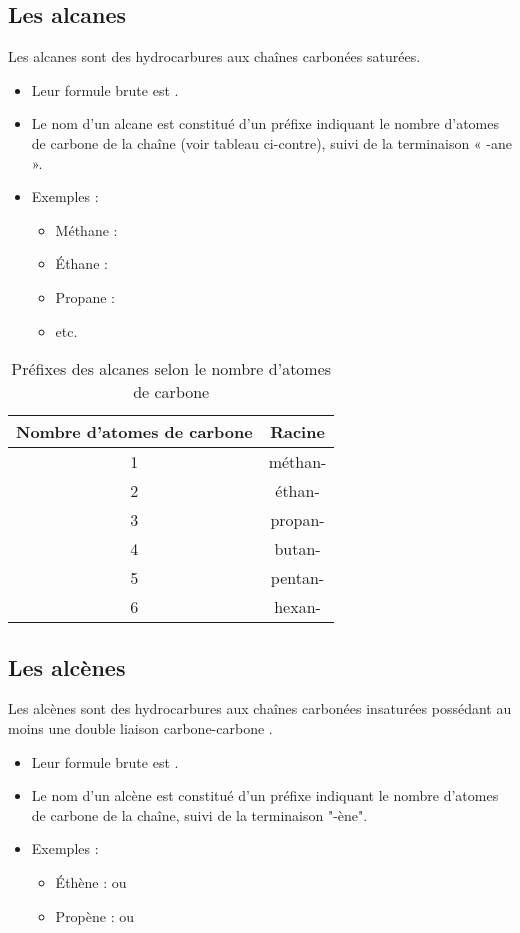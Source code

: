 \documentclass{article}
\begin{document}
\subsection{Les alcanes}

Les alcanes sont des hydrocarbures aux chaînes carbonées saturées.
\begin{itemize}[noitemsep]
    \item Leur formule brute est .
    \item Le nom d’un alcane est constitué d’un préfixe indiquant le nombre d'atomes de carbone de la chaîne (voir tableau ci-contre), suivi de la terminaison « -ane ».
    \item Exemples :
    \begin{itemize}
        \item Méthane : 
        \item Éthane : 
        \item Propane : 
        \item etc.
    \end{itemize}
\end{itemize}

\begin{table}[h]
    \centering
    \begin{tabular}{|c|c|}
    \hline
    Nombre d’atomes de carbone & Racine \\
    \hline
    1 & méthan- \\
    2 & éthan- \\
    3 & propan- \\
    4 & butan- \\
    5 & pentan- \\
    6 & hexan- \\
    \hline
    \end{tabular}
    \caption{Préfixes des alcanes selon le nombre d'atomes de carbone}
\end{table}

\subsection{Les alcènes}

Les alcènes sont des hydrocarbures aux chaînes carbonées insaturées possédant au moins une double liaison carbone-carbone .
\begin{itemize}[noitemsep]
    \item Leur formule brute est .
    \item Le nom d’un alcène est constitué d’un préfixe indiquant le nombre d'atomes de carbone de la chaîne, suivi de la terminaison  "-ène".
    \item Exemples :
    \begin{itemize}
        \item Éthène :  ou 
        \item Propène :  ou 
    \end{itemize}
\end{itemize}
\end{document}
